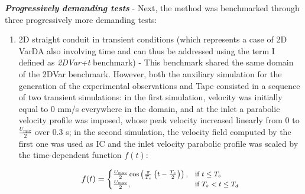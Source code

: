 \textbf{\textit{Progressively demanding tests}} - Next, the method was benchmarked through three progressively more demanding tests:

\begin{enumerate}
    \item 2D straight conduit in transient conditions (which represents a case of 2D VarDA also involving time and can thus be addressed using the term I defined as \emph{2DVar+t} benchmark) - This benchmark shared the same domain of the 2DVar benchmark. However, both the auxiliary simulation for the generation of the experimental observations and Tape consisted in a sequence of two transient simulations: in the first simulation, velocity was initially equal to 0 mm/s everywhere in the domain, and at the inlet a parabolic velocity profile was imposed, whose peak velocity increased linearly from 0 to \( \frac{ U_{\text{max}}}{2} \) over 0.3 s; in the second simulation, the velocity field computed by the first one was used as IC and the inlet velocity parabolic profile was scaled by the time-dependent function \( f(t) \):

\begin{equation}
\small
f(t) = 
\begin{cases}
\frac{U_{\text{max}}}{2}\cos\left(\frac{\pi}{T_s}\left(t - \frac{T_s}{2}\right)\right), & \text{if } t \leq T_s \\
\frac{U_{\text{max}}}{2}, & \text{if } T_s < t \leq T_d
\label{eq:13}
\end{cases}
\end{equation}


\end{enumerate}
